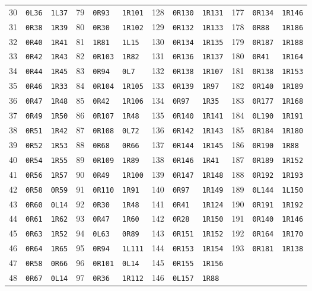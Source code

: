 \begin{center}
\begin{tabular}{@{}rll@{\quad}rll@{\quad}rll@{\quad}rll@{}}
30&\texttt{0L36}&\texttt{1L37}&79&\texttt{0R93}&\texttt{1R101}&128&\texttt{0R130}&\texttt{1R131}&177&\texttt{0R134}&\texttt{1R146}\\
31&\texttt{0R38}&\texttt{1R39}&80&\texttt{0R30}&\texttt{1R102}&129&\texttt{0R132}&\texttt{1R133}&178&\texttt{0R88}&\texttt{1R186}\\
32&\texttt{0R40}&\texttt{1R41}&81&\texttt{1R81}&\texttt{1L15}&130&\texttt{0R134}&\texttt{1R135}&179&\texttt{0R187}&\texttt{1R188}\\
33&\texttt{0R42}&\texttt{1R43}&82&\texttt{0R103}&\texttt{1R82}&131&\texttt{0R136}&\texttt{1R137}&180&\texttt{0R41}&\texttt{1R164}\\
34&\texttt{0R44}&\texttt{1R45}&83&\texttt{0R94}&\texttt{0L7}&132&\texttt{0R138}&\texttt{1R107}&181&\texttt{0R138}&\texttt{1R153}\\
35&\texttt{0R46}&\texttt{1R33}&84&\texttt{0R104}&\texttt{1R105}&133&\texttt{0R139}&\texttt{1R97}&182&\texttt{0R140}&\texttt{1R189}\\
36&\texttt{0R47}&\texttt{1R48}&85&\texttt{0R42}&\texttt{1R106}&134&\texttt{0R97}&\texttt{1R35}&183&\texttt{0R177}&\texttt{1R168}\\
37&\texttt{0R49}&\texttt{1R50}&86&\texttt{0R107}&\texttt{1R48}&135&\texttt{0R140}&\texttt{1R141}&184&\texttt{0L190}&\texttt{1R191}\\
38&\texttt{0R51}&\texttt{1R42}&87&\texttt{0R108}&\texttt{0L72}&136&\texttt{0R142}&\texttt{1R143}&185&\texttt{0R184}&\texttt{1R180}\\
39&\texttt{0R52}&\texttt{1R53}&88&\texttt{0R68}&\texttt{0R66}&137&\texttt{0R144}&\texttt{1R145}&186&\texttt{0R190}&\texttt{1R88}\\
40&\texttt{0R54}&\texttt{1R55}&89&\texttt{0R109}&\texttt{1R89}&138&\texttt{0R146}&\texttt{1R41}&187&\texttt{0R189}&\texttt{1R152}\\
41&\texttt{0R56}&\texttt{1R57}&90&\texttt{0R49}&\texttt{1R100}&139&\texttt{0R147}&\texttt{1R148}&188&\texttt{0R192}&\texttt{1R193}\\
42&\texttt{0R58}&\texttt{0R59}&91&\texttt{0R110}&\texttt{1R91}&140&\texttt{0R97}&\texttt{1R149}&189&\texttt{0L144}&\texttt{1L150}\\
43&\texttt{0R60}&\texttt{0L14}&92&\texttt{0R30}&\texttt{1R48}&141&\texttt{0R41}&\texttt{1R124}&190&\texttt{0R191}&\texttt{1R192}\\
44&\texttt{0R61}&\texttt{1R62}&93&\texttt{0R47}&\texttt{1R60}&142&\texttt{0R28}&\texttt{1R150}&191&\texttt{0R140}&\texttt{1R146}\\
45&\texttt{0R63}&\texttt{1R52}&94&\texttt{0L63}&\texttt{0R89}&143&\texttt{0R151}&\texttt{1R152}&192&\texttt{0R164}&\texttt{1R170}\\
46&\texttt{0R64}&\texttt{1R65}&95&\texttt{0R94}&\texttt{1L111}&144&\texttt{0R153}&\texttt{1R154}&193&\texttt{0R181}&\texttt{1R138}\\
47&\texttt{0R58}&\texttt{0R66}&96&\texttt{0R101}&\texttt{0L14}&145&\texttt{0R155}&\texttt{1R156}&&&\\
48&\texttt{0R67}&\texttt{0L14}&97&\texttt{0R36}&\texttt{1R112}&146&\texttt{0L157}&\texttt{1R88}&&&\\
\bottomrule\end{tabular}\end{center}
